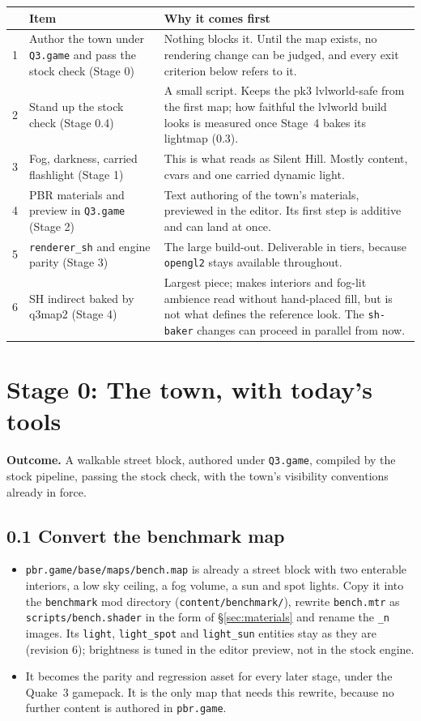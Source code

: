 \documentclass[11pt,a4paper]{article}
\begin{document}
\begin{tabular}{@{}rp{}p{}@{}}
\toprule
& Item & Why it comes first \\
\midrule
1 & Author the town under \texttt{Q3.game} and pass the stock check (Stage 0) & Nothing blocks it.
    Until the map exists, no rendering change can be judged, and every exit criterion below refers
    to it. \\
2 & Stand up the stock check (Stage 0.4) & A small script. Keeps the pk3 lvlworld-safe from the
    first map; how faithful the lvlworld build looks is measured once Stage~4 bakes its lightmap
    (0.3). \\
3 & Fog, darkness, carried flashlight (Stage 1) & This is what reads as Silent Hill. Mostly
    content, cvars and one carried dynamic light. \\
4 & PBR materials and preview in \texttt{Q3.game} (Stage 2) & Text authoring of the town's
    materials, previewed in the editor. Its first step is additive and can land at once. \\
5 & \texttt{renderer\_sh} and engine parity (Stage 3) & The large build-out. Deliverable in
    tiers, because \texttt{opengl2} stays available throughout. \\
6 & SH indirect baked by q3map2 (Stage 4) & Largest piece; makes interiors and fog-lit ambience
    read without hand-placed fill, but is not what defines the reference look. The
    \texttt{sh-baker} changes can proceed in parallel from now. \\
\bottomrule
\end{tabular}

\section{Stage 0: The town, with today's tools}

\textbf{Outcome.} A walkable street block, authored under \texttt{Q3.game}, compiled by the stock
pipeline, passing the stock check, with the town's visibility conventions already in force.

\subsection{0.1 Convert the benchmark map}
\begin{itemize}
\item \texttt{pbr.game/base/maps/bench.map} is already a street block with two enterable
  interiors, a low sky ceiling, a fog volume, a sun and spot lights. Copy it into the
  \texttt{benchmark} mod directory (\texttt{content/benchmark/}), rewrite \texttt{bench.mtr} as
  \texttt{scripts/bench.shader} in the form of §\ref{sec:materials} and rename the \texttt{\_n}
  images. Its \texttt{light}, \texttt{light\_spot} and \texttt{light\_sun} entities stay as they are
  (revision 6); brightness is tuned in the editor preview, not in the stock engine.
\item It becomes the parity and regression asset for every later stage, under the Quake~3 gamepack.
  It is the only map that needs this rewrite, because no further content is authored in
  \texttt{pbr.game}.
\end{itemize}
\end{document}
